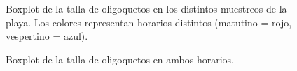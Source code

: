 \documentclass[
  authoryear,
  preprint,
  3p,
  twocolumn]{elsarticle}
\begin{document}
\begin{figure}


\caption{\label{fig-5}Boxplot de la talla de oligoquetos en los
distintos muestreos de la playa. Los colores representan horarios
distintos (matutino = rojo, vespertino = azul).}

\end{figure}%

\begin{figure}


\caption{\label{fig-6}Boxplot de la talla de oligoquetos en ambos
horarios.}

\end{figure}%
\end{document}
